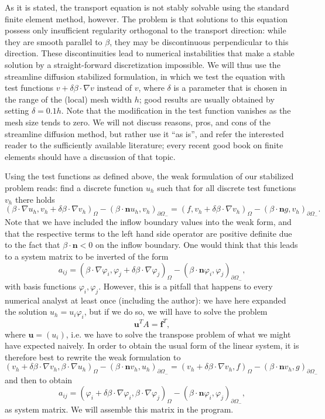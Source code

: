 \documentclass{article}
\renewcommand{\vec}[1]{{\mathbf #1}}
\begin{document}
As it is stated, the transport equation is not stably solvable using
the standard finite element method, however. The problem is that
solutions to this equation possess only insufficient regularity
orthogonal to the transport direction: while they are smooth parallel
to $\beta$, they may be discontinuous perpendicular to this
direction. These discontinuities lead to numerical instabilities that
make a stable solution by a straight-forward discretization
impossible. We will thus use the streamline diffusion stabilized
formulation, in which we test the equation with test functions $v +
\delta \beta\cdot\nabla v$ instead of $v$, where $\delta$ is a
parameter that is chosen in the range of the (local) mesh width $h$;
good results are usually obtained by setting $\delta=0.1h$. Note that
the modification in the test function vanishes as the mesh size tends
to zero. We will not discuss reasons, pros, and cons of the streamline
diffusion method, but rather use it ``as is'', and refer the
interested reader to the sufficiently available literature; every
recent good book on finite elements should have a discussion of that
topic.

Using the test functions as defined above, the weak formulation of
our stabilized problem reads: find a discrete function $u_h$ such that
for all discrete test functions $v_h$ there holds
$$
  (\beta \cdot \nabla u_h, v_h + \delta \beta\cdot\nabla v_h)_\Omega
  -
  (\beta\cdot \vec n u_h, v_h)_{\partial\Omega_-}
  =
  (f, v_h + \delta \beta\cdot\nabla v_h)_\Omega
  -
  (\beta\cdot \vec n g, v_h)_{\partial\Omega_-}.
$$
Note that we have included the inflow boundary values into the weak
form, and that the respective terms to the left hand side operator are
positive definite due to the fact that $\beta\cdot\vec n<0$ on the
inflow boundary. One would think that this leads to a system matrix
to be inverted of the form
$$
  a_{ij} =
  (\beta \cdot \nabla \varphi_i,
   \varphi_j + \delta \beta\cdot\nabla \varphi_j)_\Omega
  -
  (\beta\cdot \vec n \varphi_i, \varphi_j)_{\partial\Omega_-},
$$
with basis functions $\varphi_i,\varphi_j$.  However, this is a
pitfall that happens to every numerical analyst at least once
(including the author): we have here expanded the solution
$u_h = u_i \varphi_i$, but if we do so, we will have to solve the 
problem 
$$
  \vec u^T A = \vec f^T,
$$
where $\vec u=(u_i)$, i.e. we have to solve the transpose problem of
what we might have expected naively. In order to obtain the usual form
of the linear system, it is therefore best to rewrite the weak
formulation to
$$
  (v_h + \delta \beta\cdot\nabla v_h, \beta \cdot \nabla u_h)_\Omega
  -
  (\beta\cdot \vec n v_h, u_h)_{\partial\Omega_-}
  =
  (v_h + \delta \beta\cdot\nabla v_h, f)_\Omega
  -
  (\beta\cdot \vec n v_h, g)_{\partial\Omega_-}
$$
and then to obtain
$$
  a_{ij} =
  (\varphi_i + \delta \beta \cdot \nabla \varphi_i,
   \beta\cdot\nabla \varphi_j)_\Omega
  -
  (\beta\cdot \vec n \varphi_i, \varphi_j)_{\partial\Omega_-},
$$
as system matrix. We will assemble this matrix in the program.
\end{document}
